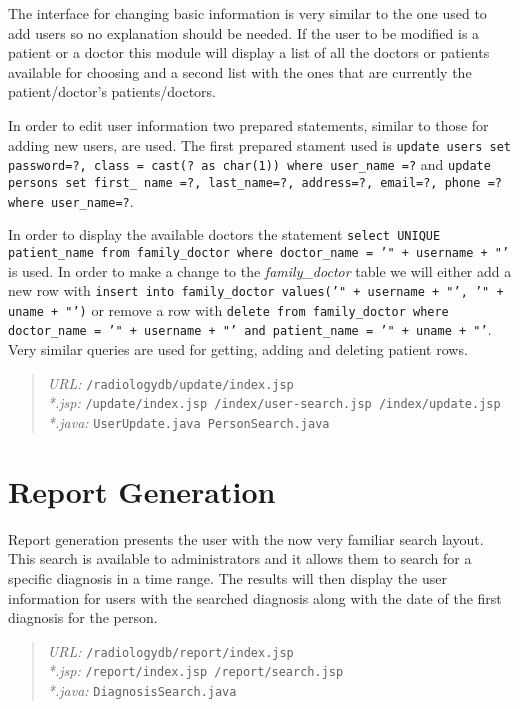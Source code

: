 \documentclass[11pt]{report}
\begin{document}
The interface for changing basic information is very similar to the one used to add users so no explanation should be needed. If the user to be modified is a patient or a doctor this module will display a list of all the doctors or patients available for choosing and a second list with the ones that are currently the patient/doctor's patients/doctors.

In order to edit user information two prepared statements, similar to those for adding new users, are used. The first prepared stament used is \texttt{update users set password=?, class = cast(? as char(1)) where user\_name =?} and \texttt{update persons set first\_ name =?, last\_name=?, address=?, email=?, phone =? where user\_name=?}.

In order to display the available doctors the statement \texttt{select UNIQUE patient\_name from family\_doctor where doctor\_name = '" + username + "'} is used. In order to make a change to the \emph{family\_doctor} table we will either add a new row with \texttt{insert into family\_doctor values('" + username + "', '" + uname + "')} or remove a row with \texttt{delete from family\_doctor where doctor\_name = '" + username + "' and patient\_name = '" + uname + "'}. Very similar queries are used for getting, adding and deleting patient rows.

\begin{quote}
\emph{URL:} \texttt{/radiologydb/update/index.jsp} \\
\emph{*.jsp: } \texttt{/update/index.jsp /index/user-search.jsp /index/update.jsp} \\
\emph{*.java: } \texttt{UserUpdate.java PersonSearch.java}
\end{quote}

\section*{Report Generation}
Report generation presents the user with the now very familiar search layout. This search is available to administrators and it allows them to search for a specific diagnosis in a time range. The results will then display the user information for users with the searched diagnosis along with the date of the first diagnosis for the person.

\begin{quote}
\emph{URL:} \texttt{/radiologydb/report/index.jsp} \\
\emph{*.jsp: } \texttt{/report/index.jsp /report/search.jsp} \\
\emph{*.java: } \texttt{DiagnosisSearch.java}
\end{quote}
\end{document}
